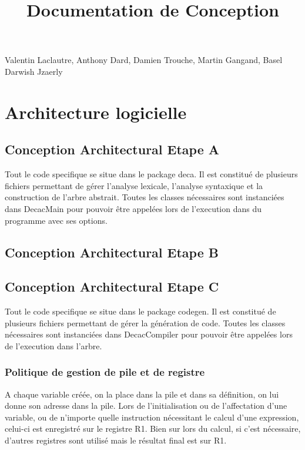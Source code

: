 \documentclass[12pt, a4paper, one side]{article}
\title{Documentation de Conception}
\author{}
\date{}
\begin{document}
    \maketitle

    \begin{center}
        Valentin Laclautre, Anthony Dard, Damien Trouche, Martin Gangand, Basel Darwish Jzaerly
    \end{center}

    \tableofcontents
    \section{Architecture logicielle}
    \subsection{Conception Architectural Etape A}
    Tout le code specifique se situe dans le package deca. Il est constitué de plusieurs fichiers
    permettant de gérer l'analyse lexicale, l'analyse syntaxique et la construction de l'arbre abstrait. Toutes les classes nécessaires sont instanciées dans DecacMain
    pour pouvoir être appelées lors de l'execution dans du programme avec ses options.
    \subsection{Conception Architectural Etape B}
    \subsection{Conception Architectural Etape C}

    Tout le code specifique se situe dans le package codegen. Il est constitué de plusieurs fichiers
    permettant de gérer la génération de code. Toutes les classes nécessaires sont instanciées dans DecacCompiler
    pour pouvoir être appelées lors de l'execution dans l'arbre.

    \subsubsection{Politique de gestion de pile et de registre}

    A chaque variable créée, on la place dans la pile et dans sa définition, on lui donne son adresse dans la pile.
    Lors de l'initialisation ou de l'affectation d'une variable, ou de n'importe quelle instruction nécessitant le
    calcul d'une expression, celui-ci est enregistré sur le registre R1. Bien sur lors du calcul, si c'est nécessaire,
    d'autres registres sont utilisé mais le résultat final est sur R1.
\end{document}
